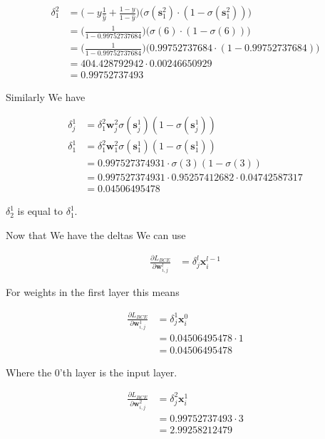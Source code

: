 \documentclass{article}
\begin{document}
	\begin{align}
	 	\delta^2_1 &= \bigg( -y\frac{1}{\hat{y}}  + \frac{1-y}{1-\hat{y}} \bigg) \bigg( \sigma(\mathbf{s}^2_1)\cdot(1-\sigma(\mathbf{s}^2_1)) \bigg)\\
	 	&= \bigg( \frac{1}{1-0.99752737684} \bigg) \bigg( \sigma(6)\cdot(1-\sigma(6)) \bigg)\\
	 	&= \bigg( \frac{1}{1-0.99752737684} \bigg) \bigg( 0.99752737684\cdot(1-0.99752737684) \bigg)\\
	 	&= 404.428792942\cdot 0.00246650929\\
	 	&= 0.99752737493
	 \end{align}
	 
	 Similarly We have
	 
	 \begin{align}
	 	\delta^1_j &=   \delta^2_1 \mathbf{w}^2_j \sigma(\mathbf{s}^{1}_j)(1-\sigma(\mathbf{s}^{1}_j))\\
	 	\delta^1_1 &=   \delta^2_1 \mathbf{w}^2_1 \sigma(\mathbf{s}^{1}_1)(1-\sigma(\mathbf{s}^{1}_1))\\
	 	&=   0.997527374931\cdot  \sigma(3)(1-\sigma(3))\\
	 	&=   0.997527374931\cdot  0.95257412682 \cdot 0.04742587317\\
	 	&= 0.04506495478
	 \end{align}
	 
	 $\delta^1_2$ is equal to $\delta^1_1$. 
	 
	 Now that We have the deltas We can use

	\begin{align}
	 	\frac{\partial L_{BCE}}{\partial \mathbf{w}^l_{i, j}} &= \delta^l_j\mathbf{x}^{l-1}_i
	 \end{align}
	 
	 For weights in the first layer this means

	\begin{align}
	 	\frac{\partial L_{BCE}}{\partial \mathbf{w}^1_{i, j}} &= \delta^1_j\mathbf{x}^{0}_i\\
	 	&= 0.04506495478\cdot 1\\
	 	&= 0.04506495478
	 \end{align}
	 
	 Where the 0'th layer is the input layer. 

	\begin{align}
	 	\frac{\partial L_{BCE}}{\partial \mathbf{w}^2_{i, j}} &= \delta^2_j\mathbf{x}^{1}_i\\
	 	&= 0.99752737493\cdot 3\\
	 	&= 2.99258212479
	 \end{align}
	 
\end{document}
